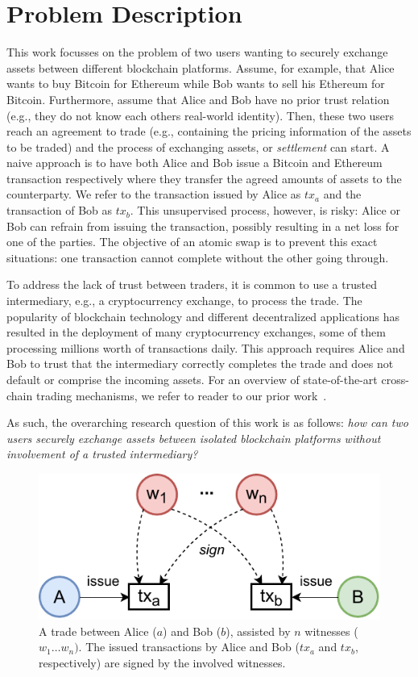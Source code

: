 \documentclass{article}
\begin{document}
\section{Problem Description}
This work focusses on the problem of two users wanting to securely exchange assets between different blockchain platforms.
Assume, for example, that Alice wants to buy Bitcoin for Ethereum while Bob wants to sell his Ethereum for Bitcoin.
Furthermore, assume that Alice and Bob have no prior trust relation (e.g., they do not know each others real-world identity).
Then, these two users reach an agreement to trade (e.g., containing the pricing information of the assets to be traded) and the process of exchanging assets, or \emph{settlement} can start.
A naive approach is to have both Alice and Bob issue a Bitcoin and Ethereum transaction respectively where they transfer the agreed amounts of assets to the counterparty.
We refer to the transaction issued by Alice as $ tx_a $ and the transaction of Bob as $ tx_b $.
This unsupervised process, however, is risky: Alice or Bob can refrain from issuing the transaction, possibly resulting in a net loss for one of the parties.
The objective of an atomic swap is to prevent this exact situations: one transaction cannot complete without the other going through.

To address the lack of trust between traders, it is common to use a trusted intermediary, e.g., a cryptocurrency exchange, to process the trade.
The popularity of blockchain technology and different decentralized applications has resulted in the deployment of many cryptocurrency exchanges, some of them processing millions worth of transactions daily.
This approach requires Alice and Bob to trust that the intermediary correctly completes the trade and does not default or comprise the incoming assets.
For an overview of state-of-the-art cross-chain trading mechanisms, we refer to reader to our prior work~\cite{de2021xchange}.

As such, the overarching research question of this work is as follows: \emph{how can two users securely exchange assets between isolated blockchain platforms without involvement of a trusted intermediary?}

\begin{figure}[t]
	\centering
	\includegraphics[width=.7\linewidth]{assets/trade_with_witnesses}
	\caption{A trade between Alice ($a$) and Bob ($ b $), assisted by $ n $ witnesses ($ w_1 \dots w_n) $. The issued transactions by Alice and Bob ($ tx_a $ and $ tx_b $, respectively) are signed by the involved witnesses.}
	\label{fig:trade_with_witnesses}
\end{figure}
\end{document}
